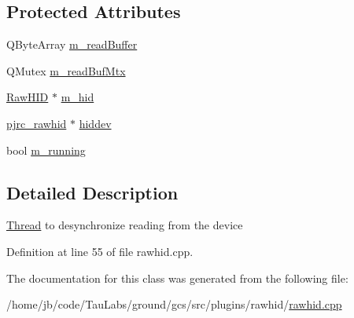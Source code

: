 \subsection*{\-Protected \-Attributes}
\begin{DoxyCompactItemize}
\item 
\-Q\-Byte\-Array \hyperlink{group___raw_h_i_d_plugin_gaab5037bdcaa413fed7fea8c575861b1b}{m\-\_\-read\-Buffer}
\item 
\-Q\-Mutex \hyperlink{group___raw_h_i_d_plugin_ga5b3754efb963cd7171d34683320c01eb}{m\-\_\-read\-Buf\-Mtx}
\item 
\hyperlink{class_raw_h_i_d}{\-Raw\-H\-I\-D} $\ast$ \hyperlink{group___raw_h_i_d_plugin_gae4904e50399d18b7cce82e865d43dcbc}{m\-\_\-hid}
\item 
\hyperlink{classpjrc__rawhid}{pjrc\-\_\-rawhid} $\ast$ \hyperlink{group___raw_h_i_d_plugin_ga1a4a37b6308c6b835b62ea90dc2a37f9}{hiddev}
\item 
bool \hyperlink{group___raw_h_i_d_plugin_ga0b977a016ba6a452e9bdf1d49e2d89e3}{m\-\_\-running}
\end{DoxyCompactItemize}


\subsection{\-Detailed \-Description}
\hyperlink{class_thread}{\-Thread} to desynchronize reading from the device 

\-Definition at line 55 of file rawhid.\-cpp.



\-The documentation for this class was generated from the following file\-:\begin{DoxyCompactItemize}
\item 
/home/jb/code/\-Tau\-Labs/ground/gcs/src/plugins/rawhid/\hyperlink{rawhid_8cpp}{rawhid.\-cpp}\end{DoxyCompactItemize}

